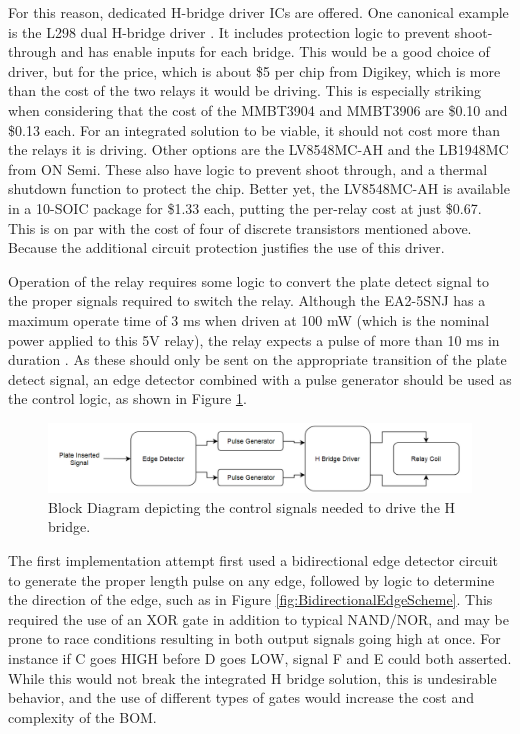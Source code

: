 \documentclass{article}
\begin{document}
		For this reason, dedicated H-bridge driver ICs are offered.  One canonical example is the L298 dual H-bridge driver \cite{L298datasheet}.  It includes protection logic to prevent shoot-through and has enable inputs for each bridge.  This would be a good choice of driver, but for the price, which is about \$5 per chip from Digikey, which is more than the cost of the two relays it would be driving.  This is especially striking when considering that the cost of the MMBT3904 and MMBT3906 are \$0.10 and \$0.13 each.  For an integrated solution to be viable, it should not cost more than the relays it is driving.  Other options are the LV8548MC-AH \cite{LV8548MCdatasheet} and the LB1948MC \cite{LB1948MCdatasheet} from ON Semi.  These also have logic to prevent shoot through, and a thermal shutdown function to protect the chip.  Better yet, the LV8548MC-AH is available in a 10-SOIC package for \$1.33 each, putting the per-relay cost at just \$0.67.  This is on par with the cost of four of discrete transistors mentioned above.  Because the additional circuit protection justifies the use of this driver.

		Operation of the relay requires some logic to convert the plate detect signal to the proper signals required to switch the relay.  Although the EA2-5SNJ has a maximum operate time of 3 ms when driven at 100 mW (which is the nominal power applied to this 5V relay), the relay expects a pulse of more than 10 ms in duration \cite{EA2datasheet}.  As these should only be sent on the appropriate transition of the plate detect signal, an edge detector combined with a pulse generator should be used as the control logic, as shown in Figure \ref{fig:HBridgeCTRL_Block}.

		\begin{figure}
			\centering
			\includegraphics[width = \textwidth]{PR2Images/HBridgeCTRL_Block.PNG}
			\caption{Block Diagram depicting the control signals needed to drive the H bridge.}
			\label{fig:HBridgeCTRL_Block}
		\end{figure}

		The first implementation attempt first used a bidirectional edge detector circuit to generate the proper length pulse on any edge, followed by logic to determine the direction of the edge, such as in Figure \ref{fig:BidirectionalEdgeScheme}.  This required the use of an XOR gate in addition to typical NAND/NOR, and may be prone to race conditions resulting in both output signals going high at once.  For instance if C goes HIGH before D goes LOW, signal F and E could both asserted.  While this would not break the integrated H bridge solution, this is undesirable behavior, and the use of different types of gates would increase the cost and complexity of the BOM.
\end{document}
